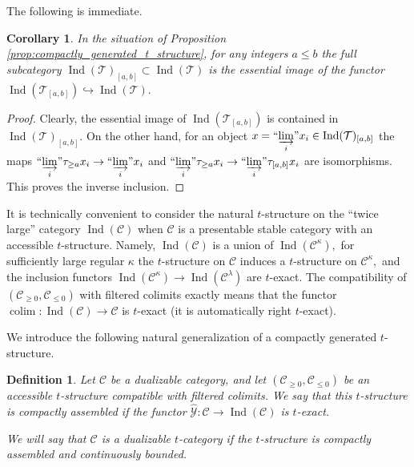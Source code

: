 \documentclass[11pt,leqno]{amsart}
\newtheorem{defi}[theo]{Definition}
\newtheorem{cor}[theo]{Corollary}
\numberwithin{equation}{section}
\DeclareMathOperator*{\colim}{colim}
\newcommand{\indlim}[1][]{\mathop{\varinjlim}\limits_{#1}}
\newcommand{\inddlim}[1][]{{``{\indlim[#1]}"}}
\newcommand{\hto}{\hookrightarrow}
\newcommand{\cC}{{\mathcal C}}
\newcommand{\cY}{{\mathcal Y}}
\newcommand{\cT}{{\mathcal T}}
\newcommand{\Ind}{\operatorname{Ind}}
\begin{document}
The following is immediate.

\begin{cor}\label{cor:Ind_of_T_a_b}
In the situation of Proposition \ref{prop:compactly_generated_t_structure}, for any integers $a\leq b$ the full subcategory $\Ind(\cT)_{[a,b]}\subset\Ind(\cT)$ is the essential image of the functor $\Ind(\cT_{[a,b]})\hto\Ind(\cT).$
\end{cor}

\begin{proof}
Clearly, the essential image of $\Ind(\cT_{[a,b]})$ is contained in $\Ind(\cT)_{[a,b]}.$ On the other hand, for an object $x=\inddlim[i]x_i\in\Ind(\cT)_{[a,b]}$ the maps $\inddlim[i]\tau_{\geq a}x_i\to\inddlim[i]x_i$ and $\inddlim[i]\tau_{\geq a}x_i\to\inddlim[i]\tau_{[a,b]}x_i$ are isomorphisms. This proves the inverse inclusion.
\end{proof}

It is technically convenient to consider the natural $t$-structure on the ``twice large'' category $\Ind(\cC)$ when $\cC$ is a presentable stable category with an accessible $t$-structure. Namely, $\Ind(\cC)$ is a union of $\Ind(\cC^{\kappa}),$ for sufficiently large regular $\kappa$ the $t$-structure on $\cC$ induces a $t$-structure on $\cC^{\kappa},$ and the inclusion functors $\Ind(\cC^{\kappa})\to\Ind(\cC^{\lambda})$ are $t$-exact. The compatibility of $(\cC_{\geq 0},\cC_{\leq 0})$ with filtered colimits exactly means that the functor $\colim:\Ind(\cC)\to\cC$ is $t$-exact (it is automatically right $t$-exact).

We introduce the following natural generalization of a compactly generated $t$-structure. 

\begin{defi}\label{def:compactly_assembled_t_structure}
Let $\cC$ be a dualizable category, and let $(\cC_{\geq 0},\cC_{\leq 0})$ be an accessible $t$-structure compatible with filtered colimits. We say that this $t$-structure is compactly assembled if the functor $\hat{\cY}:\cC\to\Ind(\cC)$ is $t$-exact.

We will say that $\cC$ is a dualizable $t$-category if the $t$-structure is compactly assembled and continuously bounded.
\end{defi}
\end{document}

